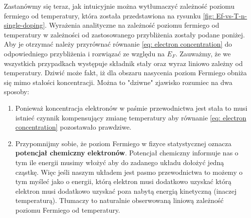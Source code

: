             \noindent Zastanówmy się teraz, jak intuicyjnie można wytłumaczyć zależność poziomu fermiego od temperatury, która została przedstawiona na rysunku 
            \ref{fig: Ef-vs-T-n-single-doping}. Wyrażenia analityczne na zależność poziomu fermiego od temperatury w zależności od zastosowanego przybliżenia zostały podane poniżej. Aby je otrzymać należy przyrównać równanie \ref{eq: electron concentration} do odpowiedniego przybliżenia i rozwiązać ze względu na $E_F$. Zauważmy, że we wszystkich przypadkach występuje składnik stały oraz wyraz liniowo zależny od temperatury. Dziwić może fakt, iż dla obszaru nasycenia poziom Fermiego obniża się mimo stałości koncentracji. Można to "dziwne" zjawisko rozumiec na dwa sposoby: 
            \begin{enumerate}
                \item Ponieważ koncentracja elektronów w paśmie przewodnictwa jest stała to musi istnieć czynnik kompensujący zmianę temperatury aby równanie \ref{eq: electron concentration} pozostawało prawdziwe.
                \item Przypomnijmy sobie, że poziom Fermiego w fizyce statystycznej oznacza \textbf{potencjał chemiczny elektronów}. Potencjał chemiczny informuje nas o tym ile energii musimy włożyć aby do zadanego układu dołożyć jedną cząstkę. 
                Więc jeśli naszym układem jest pasmo przewodnictwa to możemy o tym myśleć jako o energii, którą elektron musi dodatkowo uzyskać którą elektron musi dodatkowo uzyskać poza nabytą energią kinetyczną (inaczej temperaturą). Tłumaczy to naturalnie obserwowaną liniową zależność poziomu Fermiego od temperatury.
            \end{enumerate}
